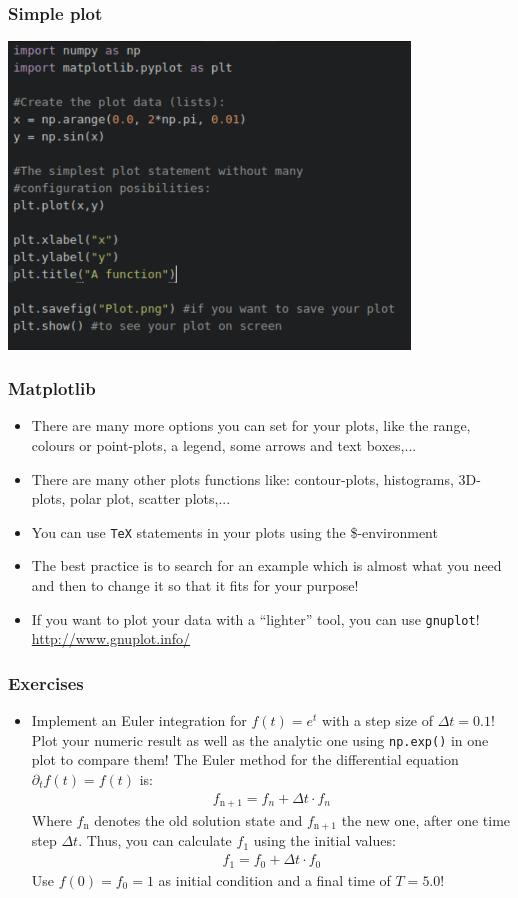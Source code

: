 \documentclass{beamer}
\begin{document}
\begin{frame}
\frametitle{Simple plot}
	\includegraphics[width = 0.8\textwidth]{SimplePlot.pdf}
\end{frame}

\begin{frame}
\frametitle{Matplotlib}
	\begin{itemize}
		\item There are many more options you can set for your plots, like the range, colours or point-plots, a legend, some arrows and text boxes,...
	 	\item There are many other plots functions like: contour-plots, histograms, 3D-plots, polar plot, scatter plots,...
	 	\item You can use \texttt{TeX} statements in your plots using the \$-environment
	 	\item The best practice is to search for an example which is almost what you need and then to change it so that it fits for your purpose!
	 	\item If you want to plot your data with a ``lighter'' tool, you can use \texttt{gnuplot}! \url{http://www.gnuplot.info/}
	\end{itemize}
\end{frame}

\begin{frame}
\frametitle{Exercises}
	\begin{itemize}
		\item Implement an Euler integration for $f(t) = e^t$ with a step size of $\Delta t = 0.1$! Plot your numeric result as well as the analytic one using \texttt{np.exp()} in one plot to compare them! The Euler method for the differential equation $\partial_t f(t) = f(t)$ is:
		\begin{align}
		f_{\mathrm{n+1}} = f_{n} + \Delta t \cdot f_{n}
		\end{align}
		Where $f_{\mathrm{n}}$ denotes the old solution state and $f_{\mathrm{n}+1}$ the new one, after one time step $\Delta t$. Thus, you can calculate $f_{1}$ using the initial values:
		\begin{align}
		f_{1} = f_{0} + \Delta t \cdot f_{0}
		\end{align}
		Use $f(0) = f_0 = 1$ as initial condition and a final time of $T = 5.0$!
		
	\end{itemize}
\end{frame}
\end{document}

